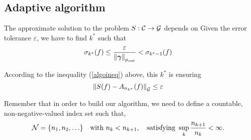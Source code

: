 \documentclass[final]{elsarticle}
\newcommand{\pout}{p_{\text{\rm{out}}}}
\newcommand{\bgamma}{\boldsymbol\gamma}
\theoremstyle{definition}
\theoremstyle{remark}
\DeclareMathOperator{\up}{up}
\DeclareMathOperator{\lo}{lo}
\begin{document}
\begin{itemize}


\end{itemize}

\subsection{Adaptive algorithm}

The approximate solution to the problem $S:\cc\rightarrow\cg$ depends on
Given the error tolerance $\varepsilon$, we have to find $k^*$ such that
\begin{equation*}
         \sigma_{k^*}(f) \le \frac{\varepsilon}{\norm[\pout]{\bgamma}} < \sigma_{k^*-1}(f)
\end{equation*}

According to the inequality (\ref{algoineq}) above, this $k^*$ is ensuring
\begin{equation*}
\norm[\cg]{S(f)-A_{n_{k^*}}(f)} \le \varepsilon
\end{equation*}

Remember that in order to build our algorithm, we need to define a countable, non-negative-valued index set such that,
\begin{equation} \label{indexdef}
\cn=\{n_1, n_2, \ldots\} \quad \text{with } n_k < n_{k+1}, \quad \text{satisfying } \sup_k \frac{n_{k+1}}{n_k} <\infty.
\end{equation}
\end{document}
